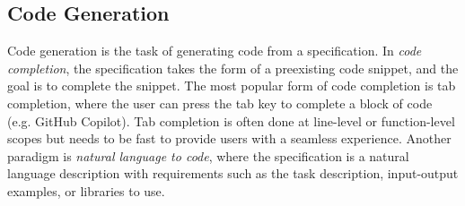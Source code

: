 




\subsection{Code Generation}

Code generation is the task of generating code from a specification. In \textit{code completion}, the specification takes the form of a preexisting code snippet, and the goal is to complete the snippet. The most popular form of code completion is tab completion, where the user can press the tab key to complete a block of code (e.g. GitHub Copilot). Tab completion is often done at line-level or function-level scopes but needs to be fast to provide users with a seamless experience. Another paradigm is \textit{natural language to code}, where the specification is a natural language description with requirements such as the task description, input-output examples, or libraries to use. 

